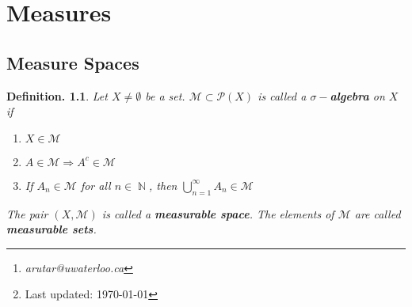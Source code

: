 \documentclass[11pt, a4paper]{memoir}
\title{\subject}
\author{Alex Rutar\thanks{\itshape arutar@uwaterloo.ca}\\ University of Waterloo}
\date{\semester\thanks{Last updated: \today}}
\DeclareMathOperator{\N}{{\mathbb{N}}}
\DeclareMathOperator{\R}{{\mathbb{R}}}
\theoremstyle{change}
\theoremstyle{plain}
\theoremstyle{nonumberplain}
\newtheorem{definition}{Definition.}
\numberwithin{equation}{section}
\begin{document}
\hypersetup{pageanchor=false}
\maketitle
\newpage
\frontmatter
\hypersetup{pageanchor=true}
\tableofcontents*
\newpage
\mainmatter


\chapter{Measures}
\section{Measure Spaces}
\begin{definition}
    Let $X\neq\emptyset$ be a set.
    $\mathcal{M}\subset\mathcal{P}(X)$ is called a \textbf{$\sigma-$algebra} on $X$ if
    \begin{enumerate}[nolistsep]
        \item $X\in \mathcal{M}$
        \item $A\in\mathcal{M}\Rightarrow A^c\in\mathcal{M}$
        \item If $A_n\in\mathcal{M}$ for all $n\in\N$, then $\bigcup_{n=1}^\infty A_n\in\mathcal{M}$
    \end{enumerate}
    The pair $(X,\mathcal{M})$ is called a \textbf{measurable space}.
    The elements of $\mathcal{M}$ are called \textbf{measurable sets}.
\end{definition}
\end{document}
